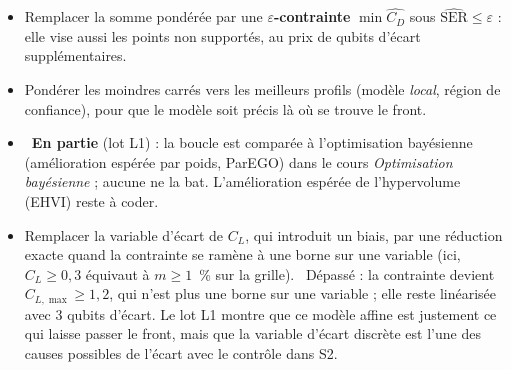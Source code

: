 \begin{pistes}
\begin{itemize}
\item Remplacer la somme pondérée par une \textbf{$\varepsilon$-contrainte} $\min\widehat{C_D}$ sous $\widehat{\mathrm{SER}}\le\varepsilon$ : elle vise aussi les points non supportés, au prix de qubits d'écart supplémentaires.
\item Pondérer les moindres carrés vers les meilleurs profils (modèle \emph{local}, région de confiance), pour que le modèle soit précis là où se trouve le front.
\item {}~\textbf{En partie} (lot L1) : la boucle est comparée à l'optimisation bayésienne (amélioration espérée par poids, ParEGO) dans le cours \emph{Optimisation bayésienne} ; aucune ne la bat. L'amélioration espérée de l'hypervolume (EHVI) reste à coder.
\item Remplacer la variable d'écart de $C_L$, qui introduit un biais, par une réduction exacte quand la contrainte se ramène à une borne sur une variable (ici, $C_L\ge0{,}3$ équivaut à $m\ge1$~\% sur la grille). ~Dépassé : la contrainte devient $C_{L,\max}\ge1{,}2$, qui n'est plus une borne sur une variable ; elle reste linéarisée avec 3 qubits d'écart. Le lot L1 montre que ce modèle affine est justement ce qui laisse passer le front, mais que la variable d'écart discrète est l'une des causes possibles de l'écart avec le contrôle dans S2.
\end{itemize}
\end{pistes}
